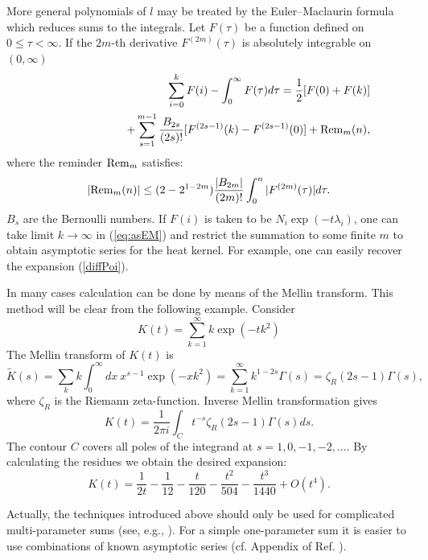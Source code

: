 More general polynomials of $l$ may be treated by the 
Euler--Maclaurin formula which reduces sums to the integrals.
Let $F(\tau )$ be a function defined on $0 \le \tau < \infty$. If the
$2m$-th derivative
$F^{(2m)}(\tau)$ is absolutely integrable on $(0,\infty )$ 
\begin{eqnarray}
&&\sum_{i=0}^k F(i) -\int_0^\infty F(\tau )d\tau =\frac 12 [F(0)+F(k)]
\nonumber \\
&&\qquad\qquad\qquad +\sum_{s=1}^{m-1} \frac {B_{2s}}{(2s)!}
[F^{(2s-1)}(k)-F^{(2s-1)}(0)]+{\rm Rem}_m(n), \label{eq:asEM}
\end{eqnarray}
where the reminder ${\rm Rem}_m$ satisfies:
\begin{equation}
|{\rm Rem}_m(n)| \le (2-2^{1-2m}) \frac {|B_{2m}|}{(2m)!}
\int_0^n |F^{(2m)}(\tau )| d\tau .
\label{eq:asrem}
\end{equation}
$B_s$ are the Bernoulli numbers. If $F(i)$ is taken to be
$N_i \exp (-t \lambda_i )$, one can take limit $k\to \infty$
in (\ref{eq:asEM}) and restrict the summation to some finite
$m$ to obtain asymptotic series for the heat kernel.
For example, one can easily recover the expansion (\ref{diffPoi}).

In many cases calculation can be done by means of the Mellin transform.
This method will be clear from the following example.
Consider
\begin{equation}
K(t)=\sum_{k=1}^\infty k\exp (-tk^2) \label{(A.1)}
\end{equation}
The Mellin transform of $K(t)$ is
\begin{equation}
\tilde K(s)=\sum_k k \int_0^\infty dx\ x^{s-1}
\exp (-xk^2) =\sum_{k=1}^\infty k^{1-2s}\Gamma (s)
=\zeta_R(2s-1) \Gamma (s), \label{(A.2)}
\end{equation}
where $\zeta_R$ is the Riemann zeta-function. Inverse
Mellin transformation gives
\begin{equation}
K(t)=\frac 1{2\pi i} \int_C t^{-s} \zeta_R(2s-1)
\Gamma (s) ds. \label{(A.3)}
\end{equation}
The contour $C$ covers all poles of the integrand
at $s=1, 0, -1, -2,\dots$. By calculating the residues we
obtain the desired expansion:
\begin{equation}
K(t)=\frac 1{2t} -\frac 1{12} -\frac t{120}
-\frac {t^2}{504} -\frac {t^3}{1440} +O(t^4).
\end{equation}

Actually, the techniques introduced above should only be
used for complicated multi-parameter sums (see, e.g.,
\cite{Lyakhovsky:1991vv}).
For a simple one-parameter sum it is easier to
use combinations of known asymptotic series (cf. Appendix
of Ref. \cite{Birmingham:1987cy}).

